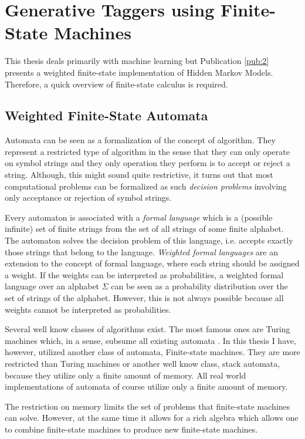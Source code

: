 \chapter{Generative Taggers using Finite-State Machines}
\label{chap:fsm}
This thesis deals primarily with machine learning but
Publication \ref{pub:2}  presents a weighted finite-state implementation
of Hidden Markov Models. Therefore, a quick overview of finite-state
calculus is required.

\section{Weighted Finite-State Automata}

Automata can be seen as a formalization of the concept of
algorithm. They represent a restricted type of algorithm in the sense
that they can only operate on symbol strings and they only operation
they perform is to accept or reject a string. Although, this might
sound quite restrictive, it turns out that most computational problems
can be formalized as such {\it decision problems} involving only
acceptance or rejection of symbol strings.

Every automaton is associated with a {\it formal language} which is a
(possible infinite) set of finite strings from the set of all strings
of some finite alphabet. The automaton solves the decision problem of
this language, i.e. accepts exactly those strings that belong to the
language. {\it Weighted formal languages} are an extension to the
concept of formal language, where each string should be assigned a
weight. If the weights can be interpreted as probabilities, a weighted
formal language over an alphabet $\Sigma$ can be seen as a probability
distribution over the set of strings of the alphabet. However, this is
not always possible because all weights cannot be interpreted as
probabilities.

Several well know classes of algorithms exist. The most famous ones
are Turing machines which, in a sense, subsume all existing automata
\cite{?}. In this thesis I have, however, utilized another class of
automata, Finite-state machines. They are more restricted than Turing
machines or another well know class, stack automata, because they
utilize only a finite amount of memory. All real world implementations
of automata of course utilize only a finite amount of memory.

The restriction on memory limits the set of problems that finite-state
machines can solve. However, at the same time it allows for a rich
algebra which allows one to combine finite-state machines to produce
new finite-state machines.

